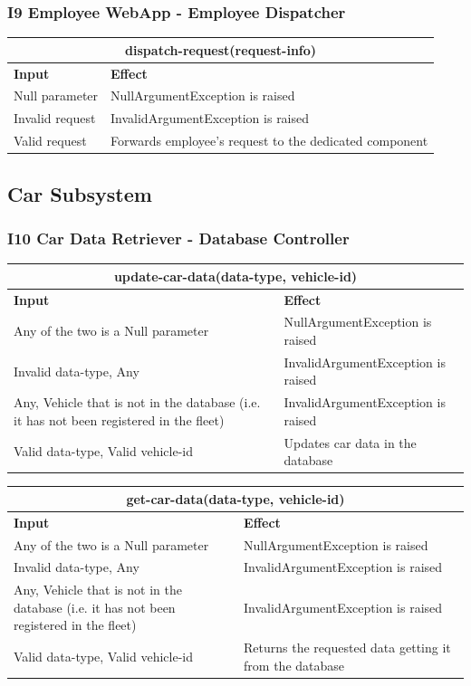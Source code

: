 \documentclass{article}
\begin{document}
\subsubsection{I9 Employee WebApp - Employee Dispatcher}
\begin{tabular}{ |p{5cm}|p{7cm}| }
  \hline
  \multicolumn{2}{|c|}{dispatch-request(request-info)} \\
  \hline
  \textbf{Input} & \textbf{Effect} \\
  \hline
  Null parameter & NullArgumentException is raised\\
  \hline
  Invalid request & InvalidArgumentException is raised \\
  \hline
  Valid request & Forwards employee's request to the dedicated component\\
  \hline
\end{tabular}
\subsection{Car Subsystem}
\subsubsection{I10 Car Data Retriever - Database Controller}
\begin{tabular}{ |p{5cm}|p{7cm}| }
  \hline
  \multicolumn{2}{|c|}{update-car-data(data-type, vehicle-id)} \\
  \hline
  \textbf{Input} & \textbf{Effect} \\
  \hline
  Any of the two is a Null parameter & NullArgumentException is raised\\
  \hline
  Invalid data-type, Any & InvalidArgumentException is raised\\
  \hline
  Any, Vehicle that is not in the database (i.e. it has not been registered in the fleet) & InvalidArgumentException is raised\\
  \hline
   Valid data-type, Valid vehicle-id & Updates car data in the database\\
  \hline
\end{tabular}
\newline
\begin{tabular}{ |p{5cm}|p{7cm}| }
  \hline
  \multicolumn{2}{|c|}{get-car-data(data-type, vehicle-id)} \\
  \hline
  \textbf{Input} & \textbf{Effect} \\
  \hline
  Any of the two is a Null parameter & NullArgumentException is raised\\
  \hline
  Invalid data-type, Any & InvalidArgumentException is raised\\
  \hline
  Any, Vehicle that is not in the database (i.e. it has not been registered in the fleet) & InvalidArgumentException is raised\\
  \hline
   Valid data-type, Valid vehicle-id & Returns the requested data getting it from the database\\
  \hline
\end{tabular}
\end{document}
